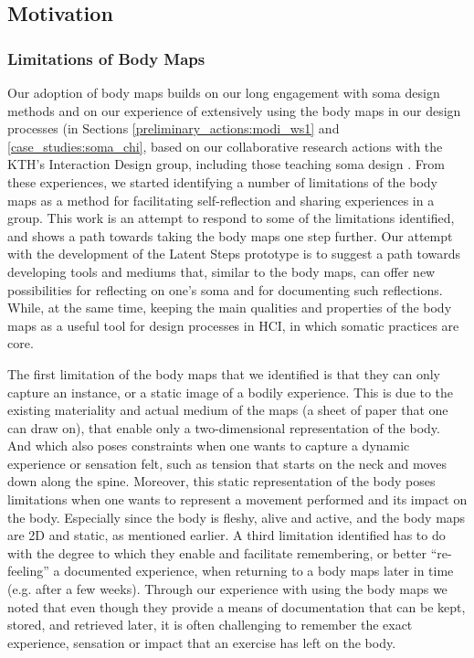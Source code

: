 
\subsection{Motivation}

\subsubsection{Limitations of Body Maps}

Our adoption of body maps builds on our long engagement with soma design methods and on our experience of extensively using the body maps in our design processes (in Sections \ref{preliminary_actions:modi_ws1} and \ref{case_studies:soma_chi}, based on our collaborative research actions with the KTH's Interaction Design group, including those teaching soma design \cite{tsaknaki_teaching_2019}. From these experiences, we started identifying a number of limitations of the body maps as a method for facilitating self-reflection and sharing experiences in a group. This work is an attempt to respond to some of the limitations identified, and shows a path towards taking the body maps one step further. Our attempt with the development of the Latent Steps prototype is to suggest a path towards developing tools and mediums that, similar to the body maps, can offer new possibilities for reflecting on one's soma and for documenting such reflections. While, at the same time, keeping the main qualities and properties of the body maps as a useful tool for design processes in HCI, in which somatic practices are core.

The first limitation of the body maps that we identified is that they can only capture an instance, or a static image of a bodily experience. This is due to the existing materiality and actual medium of the maps (a sheet of paper that one can draw on), that enable only a two-dimensional representation of the body. And which also poses constraints when one wants to capture a dynamic experience or sensation felt, such as tension that starts on the neck and moves down along the spine. Moreover, this static representation of the body poses limitations when one wants to represent a movement performed and its impact on the body. Especially since the body is fleshy, alive and active, and the body maps are 2D and static, as mentioned earlier. A third limitation identified has to do with the degree to which they enable and facilitate remembering, or better ``re-feeling'' a documented experience, when returning to a body maps later in time (e.g. after a few weeks). Through our experience with using the body maps we noted that even though they provide a means of documentation that can be kept, stored, and retrieved later, it is often challenging to remember the exact experience, sensation or impact that an exercise has left on the body.

